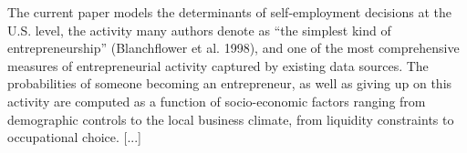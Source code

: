 The current paper models the determinants of self-employment decisions at the U.S. level, the activity many authors denote as “the simplest kind of entrepreneurship” (Blanchflower et al. 1998), and one of the most comprehensive measures of entrepreneurial activity captured by existing data sources. The probabilities of someone becoming an entrepreneur, as well as giving up on this activity are computed as a function of  socio-economic factors ranging from demographic controls to the local business climate, from liquidity constraints to occupational choice. [...] 